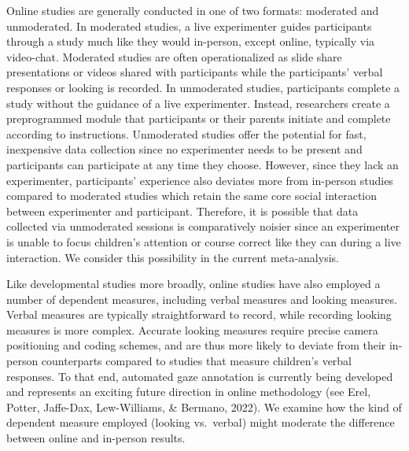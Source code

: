 \documentclass[
  man,floatsintext]{apa6}
\begin{document}
Online studies are generally conducted in one of two formats: moderated and unmoderated. In moderated studies, a live experimenter guides participants through a study much like they would in-person, except online, typically via video-chat. Moderated studies are often operationalized as slide share presentations or videos shared with participants while the participants' verbal responses or looking is recorded. In unmoderated studies, participants complete a study without the guidance of a live experimenter. Instead, researchers create a preprogrammed module that participants or their parents initiate and complete according to instructions. Unmoderated studies offer the potential for fast, inexpensive data collection since no experimenter needs to be present and participants can participate at any time they choose. However, since they lack an experimenter, participants' experience also deviates more from in-person studies compared to moderated studies which retain the same core social interaction between experimenter and participant. Therefore, it is possible that data collected via unmoderated sessions is comparatively noisier since an experimenter is unable to focus children's attention or course correct like they can during a live interaction. We consider this possibility in the current meta-analysis.

Like developmental studies more broadly, online studies have also employed a number of dependent measures, including verbal measures and looking measures. Verbal measures are typically straightforward to record, while recording looking measures is more complex. Accurate looking measures require precise camera positioning and coding schemes, and are thus more likely to deviate from their in-person counterparts compared to studies that measure children's verbal responses. To that end, automated gaze annotation is currently being developed and represents an exciting future direction in online methodology (see Erel, Potter, Jaffe-Dax, Lew-Williams, \& Bermano, 2022). We examine how the kind of dependent measure employed (looking vs.~verbal) might moderate the difference between online and in-person results.
\end{document}
